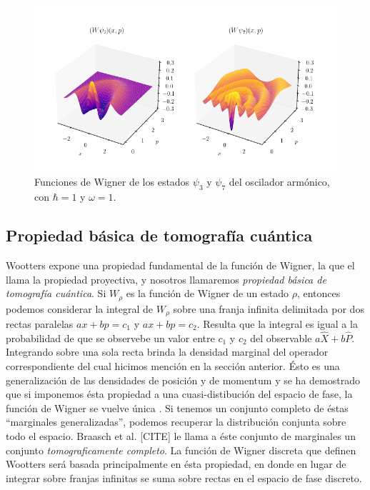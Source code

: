 \documentclass[a4paper]{report}
\begin{document}
  \begin{figure}[ht]
    \centering
    \includegraphics[width=1\textwidth]{
      imgs/harmonic_osc_wigner.png
    }
    \caption{Funciones de Wigner de los estados $\psi_3$ y
    $\psi_7$ del oscilador armónico, con $\hbar = 1$ y
    $\omega = 1$.}
    \label{fig:harmonic_osc_wigner_3_7}
  \end{figure}

  \subsection{Propiedad básica de tomografía cuántica}

  Wootters \cite{wootters1987} expone una propiedad
  fundamental de la función de Wigner, la que el llama la
  propiedad proyectiva, y nosotros llamaremos
  \textit{propiedad básica de tomografía cuántica}. Si
  $W_\rho$ es la función de Wigner de un estado $\rho$,
  entonces podemos considerar la integral de $W_\rho$ sobre
  una franja infinita delimitada por dos rectas paralelas
  $ax+bp=c_1$ y $ax+bp=c_2$.  Resulta que la integral es
  igual a la probabilidad de que se observebe un valor entre
  $c_1$ y $c_2$ del observable $a \hat X + b \hat P$.
  Integrando sobre una sola recta brinda la densidad
  marginal del operador correspondiente del cual hicimos
  mención en la sección anterior. Ésto es una
  generalización de las densidades de posición y de
  momentum y se ha demostrado que si imponemos ésta propiedad
  a una cuasi-distibución del espacio de fase, la función de
  Wigner se vuelve única \cite{ellinas2008}. Si tenemos un
  conjunto completo de éstas ``marginales generalizadas'',
  podemos recuperar la distribución conjunta sobre todo el
  espacio. Braasch et al. [CITE] le llama a éste conjunto de
  marginales un conjunto \textit{tomograficamente completo}.
  La función de Wigner discreta que definen Wootters será
  basada principalmente en ésta propiedad, en donde en lugar
  de integrar sobre franjas infinitas se suma sobre rectas
  en el espacio de fase discreto.
\end{document}
